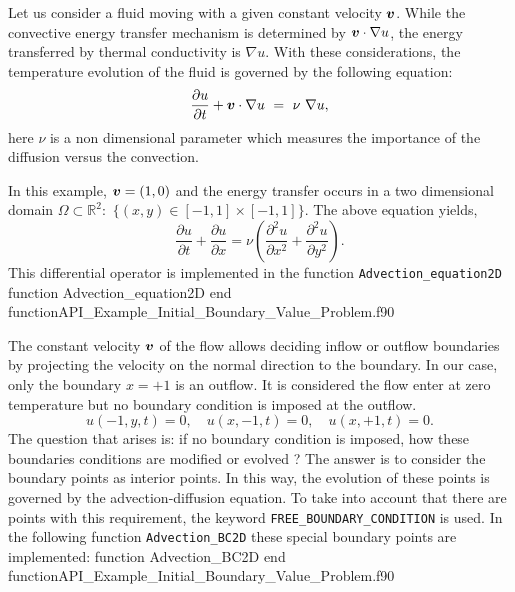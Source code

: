  Let us consider a fluid moving with a given constant velocity $\boldsymbol{v} $. 
 While the convective energy transfer mechanism is determined by $  \boldsymbol{v} \cdot \nabla u $, the energy transferred by thermal  conductivity is $ \nabla u $. 
 With these considerations, the temperature evolution of the fluid is governed by the following equation:
 \begin{equation*}
        \frac{\partial u}{\partial t} +  \boldsymbol{v} \cdot \nabla u \ = \ \nu \ \nabla u, 
 \end{equation*}
 here $ \nu $ is a non dimensional parameter which measures the importance of the diffusion versus the convection.     
 
 In this example, $ \boldsymbol{v} = (1, 0) $ and the energy transfer occurs  in a two dimensional domain
  $\Omega \subset \mathbb{R}^2 : $ $\{(x,y)\in  [-1,1]\times[-1,1]\}$. The above equation yields, 
   \begin{equation*}
        \frac{\partial u}{\partial t} +  \frac{\partial u}{\partial x} = \nu \left( \frac{\partial^2 u}{\partial x^2} + \frac{\partial^2 u}{\partial y^2} \right). 
        \end{equation*}
 This differential operator is implemented in the function \verb|Advection_equation2D|
 \vspace{0.5cm} 
        {function Advection_equation2D}
        {end function}{API_Example_Initial_Boundary_Value_Problem.f90}
         
 
 The constant velocity $ \boldsymbol{v} $ of the flow allows deciding inflow or outflow boundaries by projecting the velocity on the normal direction to the boundary. In our case, only the boundary $ x=+1$ is an outflow.
 It is considered the flow enter at zero temperature but no boundary condition is imposed at the outflow. 
 $$
   u(-1, y, t) = 0, \quad u(x, -1, t ) = 0, \quad  u(x, +1, t ) = 0.
 $$   
 The question that arises is:  if no boundary condition is imposed, how these boundaries conditions are modified or evolved ? 
 The answer is to consider the boundary points as interior points. In this way, the evolution of these points is governed by the advection-diffusion equation. To take into account that there are points with this requirement, the keyword \verb|FREE_BOUNDARY_CONDITION| is used. 
 In the following function \verb|Advection_BC2D| these special boundary points are implemented:         
 \vspace{0.5cm} 
        {function Advection_BC2D}
        {end function}{API_Example_Initial_Boundary_Value_Problem.f90}             
      
